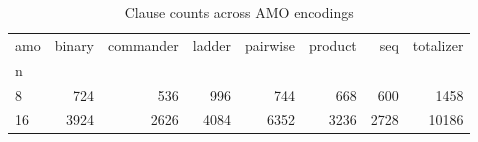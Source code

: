 \begin{table}
\caption{Clause counts across AMO encodings}
\begin{tabular}{lrrrrrrr}
\toprule
amo & binary & commander & ladder & pairwise & product & seq & totalizer \\
n &  &  &  &  &  &  &  \\
\midrule
8 & 724 & 536 & 996 & 744 & 668 & 600 & 1458 \\
16 & 3924 & 2626 & 4084 & 6352 & 3236 & 2728 & 10186 \\
\bottomrule
\end{tabular}
\end{table}
